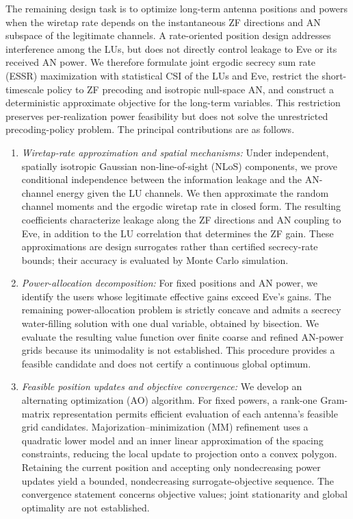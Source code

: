 \documentclass[journal]{IEEEtran}
\begin{document}
The remaining design task is to optimize long-term antenna positions and powers when the wiretap rate depends on the instantaneous ZF directions and AN subspace of the legitimate channels. A rate-oriented position design addresses interference among the LUs, but does not directly control leakage to Eve or its received AN power. We therefore formulate joint ergodic secrecy sum rate (ESSR) maximization with statistical CSI of the LUs and Eve, restrict the short-timescale policy to ZF precoding and isotropic null-space AN, and construct a deterministic approximate objective for the long-term variables. This restriction preserves per-realization power feasibility but does not solve the unrestricted precoding-policy problem. The principal contributions are as follows.
\begin{enumerate}
\item \textit{Wiretap-rate approximation and spatial mechanisms:} Under independent, spatially isotropic Gaussian non-line-of-sight (NLoS) components, we prove conditional independence between the information leakage and the AN-channel energy given the LU channels. We then approximate the random channel moments and the ergodic wiretap rate in closed form. The resulting coefficients characterize leakage along the ZF directions and AN coupling to Eve, in addition to the LU correlation that determines the ZF gain. These approximations are design surrogates rather than certified secrecy-rate bounds; their accuracy is evaluated by Monte Carlo simulation.
\item \textit{Power-allocation decomposition:} For fixed positions and AN power, we identify the users whose legitimate effective gains exceed Eve's gains. The remaining power-allocation problem is strictly concave and admits a secrecy water-filling solution with one dual variable, obtained by bisection. We evaluate the resulting value function over finite coarse and refined AN-power grids because its unimodality is not established. This procedure provides a feasible candidate and does not certify a continuous global optimum.
\item \textit{Feasible position updates and objective convergence:} We develop an alternating optimization (AO) algorithm. For fixed powers, a rank-one Gram-matrix representation permits efficient evaluation of each antenna's feasible grid candidates. Majorization--minimization (MM) refinement uses a quadratic lower model and an inner linear approximation of the spacing constraints, reducing the local update to projection onto a convex polygon. Retaining the current position and accepting only nondecreasing power updates yield a bounded, nondecreasing surrogate-objective sequence. The convergence statement concerns objective values; joint stationarity and global optimality are not established.

\end{enumerate}
\end{document}
